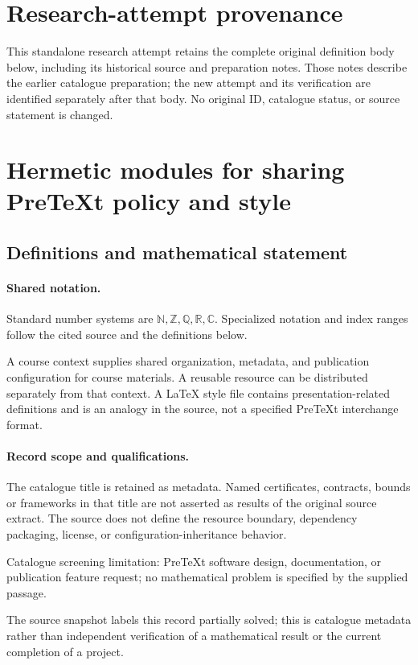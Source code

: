 \documentclass[11pt]{article}
\begin{document}
\section*{Research-attempt provenance}
This standalone research attempt retains the complete original definition body below,
including its historical source and preparation notes. Those notes describe the
earlier catalogue preparation; the new attempt and its verification are identified
separately after that body. No original ID, catalogue status, or source statement is changed.

\section{Hermetic modules for sharing PreTeXt policy and style}\label{statement}

\subsection{Definitions and mathematical statement}

\paragraph{Shared notation.}Standard number systems are $\mathbb N,\mathbb Z,\mathbb Q,\mathbb R,\mathbb C$. Specialized notation and index ranges follow the cited source and the definitions below.


A course context supplies shared organization, metadata, and publication configuration for course materials. A reusable resource can be distributed separately from that context. A LaTeX style file contains presentation-related definitions and is an analogy in the source, not a specified PreTeXt interchange format.
\paragraph{Record scope and qualifications.}
The catalogue title is retained as metadata. Named certificates, contracts, bounds or frameworks in that title are not asserted as results of the original source extract.
The source does not define the resource boundary, dependency packaging, license, or configuration-inheritance behavior.

Catalogue screening limitation: PreTeXt software design, documentation, or publication feature request; no mathematical problem is specified by the supplied passage.

The source snapshot labels this record partially solved; this is catalogue metadata rather than independent verification of a mathematical result or the current completion of a project.
\end{document}
